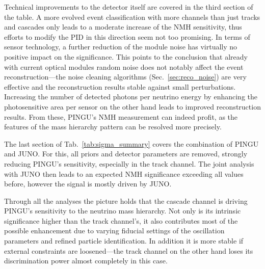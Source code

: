 Technical improvements to the detector itself are covered in the third section 
of the table. A more evolved event classification with more channels than just 
tracks and cascades only leads to a moderate increase of the NMH sensitivity, 
thus efforts to modify the PID in this direction seem not too promising. In 
terms of sensor technology, a further reduction of the module noise has 
virtually no positive impact on the significance. This points to the conclusion 
that already with current optical modules random noise does not notably affect 
the event reconstruction---the noise cleaning algorithms 
(Sec.~\ref{sec:reco_noise}) are very effective and the reconstruction results 
stable against small perturbations. Increasing the number of detected photons 
per neutrino energy by enhancing the photosensitive area per sensor on the 
other hand leads to improved reconstruction results. From these, PINGU's NMH 
measurement can indeed profit, as the features of the mass hierarchy pattern 
can be resolved more precisely.

The last section of Tab.~\ref{tab:sigma_summary} covers the combination of
PINGU and JUNO. For this, all priors and detector parameters are removed,
strongly reducing PINGU's sensitivity, especially in the track channel. The
joint analysis with JUNO then leads to an expected NMH significance exceeding
all values before, however the signal is mostly driven by JUNO.

Through all the analyses the picture holds that the cascade channel is driving
PINGU's sensitivity to the neutrino mass hierarchy. Not only is its intrinsic
significance higher than the track channel's, it also contributes most of the
possible enhancement due to varying fiducial settings of the oscillation
parameters and refined particle identification. In addition it is more stable
if external constraints are loosened---the track channel on the other hand
loses its discrimination power almost completely in this case.